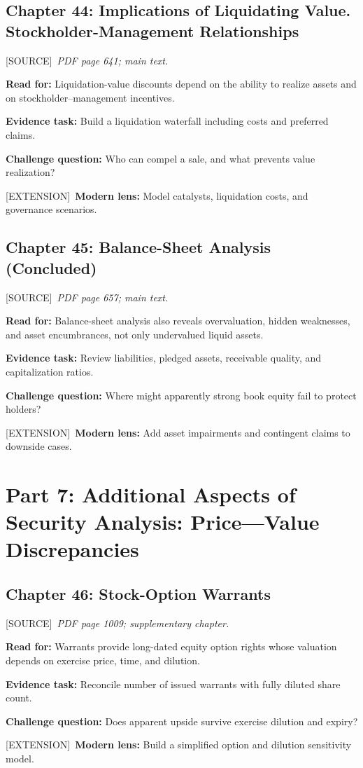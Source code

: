 \documentclass[11pt,letterpaper]{article}
\newcommand{\src}{\textsf{\color{sea}[SOURCE]}}
\newcommand{\ext}{\textsf{\color{gold}[EXTENSION]}}
\begin{document}
\subsection{Chapter 44: Implications of Liquidating Value. Stockholder-Management Relationships}
\src\ \textit{PDF page 641; main text.}\par
\textbf{Read for:} Liquidation-value discounts depend on the ability to realize assets and on stockholder--management incentives.\par
\textbf{Evidence task:} Build a liquidation waterfall including costs and preferred claims.\par
\textbf{Challenge question:} Who can compel a sale, and what prevents value realization?\par
\ext\ \textbf{Modern lens:} Model catalysts, liquidation costs, and governance scenarios.\par

\subsection{Chapter 45: Balance-Sheet Analysis (Concluded)}
\src\ \textit{PDF page 657; main text.}\par
\textbf{Read for:} Balance-sheet analysis also reveals overvaluation, hidden weaknesses, and asset encumbrances, not only undervalued liquid assets.\par
\textbf{Evidence task:} Review liabilities, pledged assets, receivable quality, and capitalization ratios.\par
\textbf{Challenge question:} Where might apparently strong book equity fail to protect holders?\par
\ext\ \textbf{Modern lens:} Add asset impairments and contingent claims to downside cases.\par

\section{Part 7: Additional Aspects of Security Analysis: Price---Value Discrepancies}

\subsection{Chapter 46: Stock-Option Warrants}
\src\ \textit{PDF page 1009; supplementary chapter.}\par
\textbf{Read for:} Warrants provide long-dated equity option rights whose valuation depends on exercise price, time, and dilution.\par
\textbf{Evidence task:} Reconcile number of issued warrants with fully diluted share count.\par
\textbf{Challenge question:} Does apparent upside survive exercise dilution and expiry?\par
\ext\ \textbf{Modern lens:} Build a simplified option and dilution sensitivity model.\par
\end{document}
